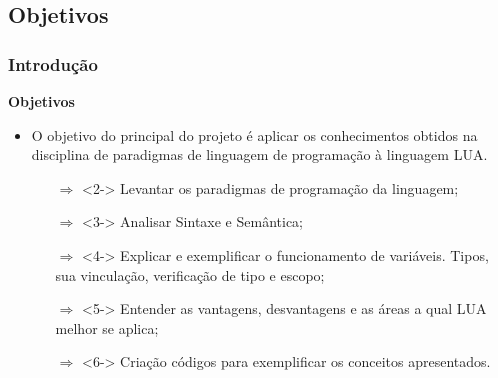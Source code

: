 \documentclass{beamer}
\begin{document}
\subsection{Objetivos}
\begin{frame}[fragile]
	\frametitle{Introdução}
	{\bf Objetivos}\vspace{0.4cm}
	\begin{itemize}
		\item<1-> O objetivo do principal do projeto é aplicar os conhecimentos obtidos na disciplina de paradigmas de linguagem de programação à linguagem LUA.
		\begin{itemize}
			\item[$\Rightarrow$]<2-> Levantar os paradigmas de programação da linguagem;
			\item[$\Rightarrow$]<3-> Analisar Sintaxe e Semântica;
			\item[$\Rightarrow$]<4-> Explicar e exemplificar o funcionamento de variáveis. Tipos, sua vinculação, verificação de tipo e escopo;
			\item[$\Rightarrow$]<5-> Entender as vantagens, desvantagens e as áreas a qual LUA melhor se aplica;
			\item[$\Rightarrow$]<6-> Criação códigos para exemplificar os conceitos apresentados. 
		\end{itemize}
	\end{itemize}
\end{frame}
\end{document}
